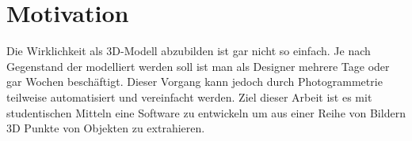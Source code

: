 

\chapter{Motivation}
Die Wirklichkeit als 3D-Modell abzubilden ist  gar nicht so einfach. Je nach Gegenstand der modelliert werden soll ist man als Designer mehrere Tage oder gar Wochen beschäftigt.
Dieser Vorgang kann jedoch durch Photogrammetrie teilweise automatisiert und vereinfacht werden.
Ziel dieser Arbeit ist es mit studentischen Mitteln eine Software zu entwickeln um aus einer Reihe von Bildern 3D Punkte von Objekten zu extrahieren.